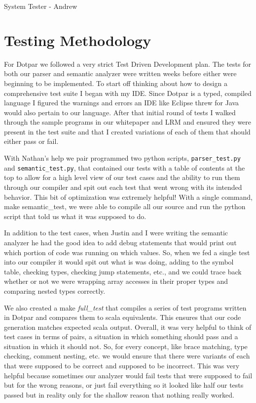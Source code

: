 System Tester - Andrew
\section{Testing Methodology}
For Dotpar we followed a very strict Test Driven Development plan. The tests for both our parser and
semantic analyzer were written weeks before either were beginning to be implemented. To start off
thinking about how to design a comprehensive test suite I began with my IDE. Since Dotpar is a typed,
compiled language I figured the warnings and errors an IDE like Eclipse threw for Java would also
pertain to our language. After that initial round of tests I walked through the sample programs in our
whitepaper and LRM and ensured they were present in the test suite and that I created variations of
each of them that should either pass or fail.

With Nathan's help we pair programmed two python scripts, \verb=parser_test.py= and \verb=semantic_test.py=, that
contained our tests with a table of contents at the top to allow for a high level view of our test cases and
the ability to run them through our compiler and spit out each test that went wrong with its intended
behavior. This bit of optimization was extremely helpful! With a single command, make semantic\_test,
we were able to compile all our source and run the python script that told us what it was supposed to
do.

In addition to the test cases, when Justin and I were writing the semantic analyzer he had the good idea
to add debug statements that would print out which portion of code was running on which values. So,
when we fed a single test into our compiler it would spit out what is was doing, adding to the symbol
table, checking types, checking jump statements, etc., and we could trace back whether or not we were
wrapping array accesses in their proper types and comparing nested types correctly.

We also created a make \emph{full\_test} that compiles a series of test programs written in Dotpar and
compares them to scala equivalents. This ensures that our code generation matches expected scala
output.
Overall, it was very helpful to think of test cases in terms of pairs, a situation in which something should
pass and a situation in which it should not. So, for every concept, like brace matching, type checking,
comment nesting, etc. we would ensure that there were variants of each that were supposed to be
correct and supposed to be incorrect. This was very helpful because sometimes our analyzer would fail
tests that were supposed to fail but for the wrong reasons, or just fail everything so it looked like half
our tests passed but in reality only for the shallow reason that nothing really worked.

